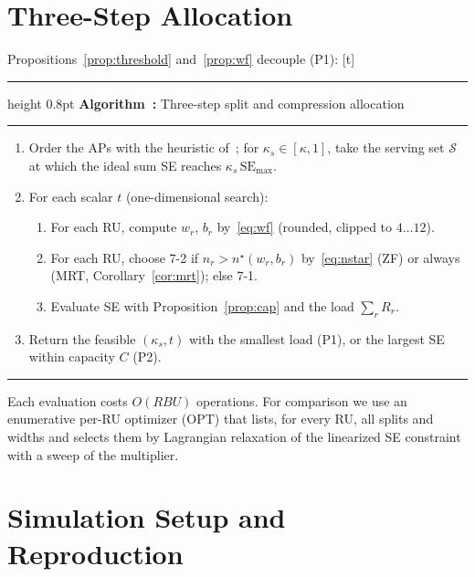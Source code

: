 \documentclass[10pt, final, journal, letterpaper, twocolumn]{IEEEtran}
\makeatletter
\newcounter{algorithm}
\newcommand{\fps@algorithm}{tbp}
\newenvironment{algorithm}[1][\fps@algorithm]{\@float{algorithm}[#1]}{\end@float}
\makeatother
\begin{document}
\section{Three-Step Allocation}
\label{sec:algorithm}

Propositions~\ref{prop:threshold} and~\ref{prop:wf} decouple (P1):
\begin{algorithm}[t]
\hrule height 0.8pt\relax\vspace{2pt}
\label{alg:cf}%
\noindent\textbf{Algorithm~\thealgorithm:} Three-step split and compression allocation
\vspace{2pt}\hrule\relax
\begin{enumerate}
  \item Order the APs with the heuristic of~\cite{girycki2024twc}; for $\kappa_s\in[\kappa,1]$, take the serving set $\mathcal{S}$ at which the ideal sum SE reaches $\kappa_s\,\mathrm{SE}_{\max}$.
  \item For each scalar $t$ (one-dimensional search):
  \begin{enumerate}
    \item For each RU, compute $w_r$, $b_r$ by~\eqref{eq:wf} (rounded, clipped to $4\ldots12$).
    \item For each RU, choose 7-2 if $n_r>n^\star(w_r,b_r)$ by~\eqref{eq:nstar} (ZF) or always (MRT, Corollary~\ref{cor:mrt}); else 7-1.
    \item Evaluate SE with Proposition~\ref{prop:cap} and the load $\sum_r R_r$.
  \end{enumerate}
  \item Return the feasible $(\kappa_s,t)$ with the smallest load (P1), or the largest SE within capacity $C$ (P2).
\end{enumerate}
\hrule\relax
\end{algorithm}
Each evaluation costs $O(RBU)$ operations. For comparison we use an enumerative per-RU optimizer (OPT) that lists, for every RU, all splits and widths and selects them by Lagrangian relaxation of the linearized SE constraint with a sweep of the multiplier.

\section{Simulation Setup and Reproduction}
\label{sec:setup}
\end{document}
